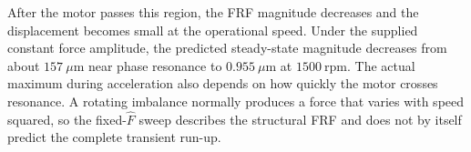 After the motor passes this region, the FRF magnitude decreases and the displacement becomes small at the operational speed. Under the supplied constant force amplitude, the predicted steady-state magnitude decreases from about $157\ \mu\mathrm{m}$ near phase resonance to $0.955\ \mu\mathrm{m}$ at $1500\ \mathrm{rpm}$. The actual maximum during acceleration also depends on how quickly the motor crosses resonance. A rotating imbalance normally produces a force that varies with speed squared, so the fixed-$\hat F$ sweep describes the structural FRF and does not by itself predict the complete transient run-up.

\clearpage
{}



\endgroup
